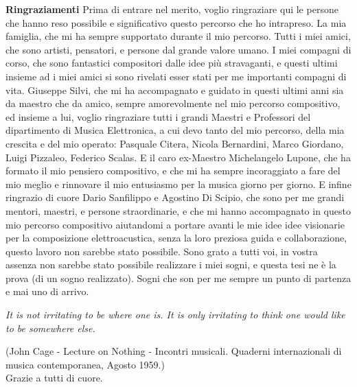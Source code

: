 \vfill
\LARGE \textbf{Ringraziamenti} \normalsize \newline \newline
Prima di entrare nel merito, voglio ringraziare qui le persone
che hanno reso possibile e significativo questo percorso che ho intrapreso.
La mia famiglia, che mi ha sempre supportato durante il mio percorso.
Tutti i miei amici, che sono artisti, pensatori, e persone dal grande valore umano.
I miei compagni di corso, che sono fantastici compositori dalle idee più stravaganti,
e questi ultimi insieme ad i miei amici si sono rivelati esser
stati per me importanti compagni di vita.
Giuseppe Silvi, che mi ha accompagnato e guidato in questi ultimi anni sia da maestro
che da amico, sempre amorevolmente nel mio percorso compositivo,
ed insieme a lui, voglio ringraziare tutti i grandi Maestri e Professori
del dipartimento di Musica Elettronica,
a cui devo tanto del mio percorso, della mia crescita e del mio operato:
Pasquale Citera, Nicola Bernardini, Marco Giordano, Luigi Pizzaleo, Federico Scalas.
E il caro ex-Maestro Michelangelo Lupone, che ha formato il mio pensiero compositivo,
e che mi ha sempre incoraggiato a fare del mio meglio e rinnovare il mio entusiasmo
per la musica giorno per giorno.
E infine ringrazio di cuore Dario Sanfilippo e Agostino Di Scipio,
che sono per me grandi mentori, maestri, e persone straordinarie,
e che mi hanno accompagnato in questo mio percorso compositivo
aiutandomi a portare avanti le
mie idee idee visionarie per la composizione elettroacustica, 
senza la loro preziosa guida e collaborazione, questo lavoro non sarebbe stato possibile.
Sono grato a tutti voi, in vostra assenza non sarebbe stato possibile realizzare i miei sogni,
e questa tesi ne è la prova (di un sogno realizzato).
Sogni che son per me sempre un punto di partenza e mai uno di arrivo.
\begin{center} \textit{
It is not irritating to be where one is. 
It is only irritating to think one would like to be somewhere else.} \\
\end{center}
(John Cage - Lecture on Nothing - Incontri musicali. 
Quaderni internazionali di musica contemporanea, Agosto 1959.) \\

Grazie a tutti di cuore.